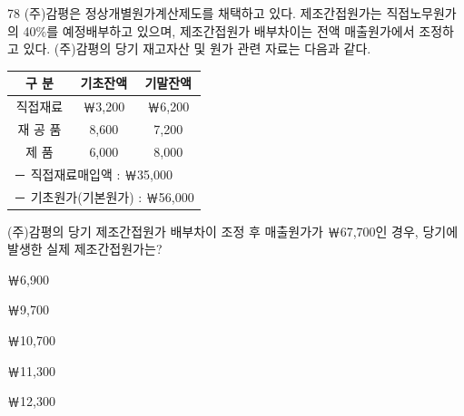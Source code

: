 \begin{question}{78}
(주)감평은 정상개별원가계산제도를 채택하고 있다. 제조간접원가는 직접노무원가의 40\%를 예정배부하고 있으며, 제조간접원가 배부차이는 전액 매출원가에서 조정하고 있다. (주)감평의 당기 재고자산 및 원가 관련 자료는 다음과 같다.
\par{\small\centering\begin{tabular}{|c|c|c|}\hline
구 분 & 기초잔액 & 기말잔액 \\ \hline
직접재료 & ￦3,200 & ￦6,200 \\ \hline
재 공 품 & 8,600 & 7,200 \\ \hline
제 \quad 품 & 6,000 & 8,000 \\ \hline
\multicolumn{3}{|l|}{ － 직접재료매입액 : ￦35,000} \\ \hline
\multicolumn{3}{|l|}{ － 기초원가(기본원가) : ￦56,000} \\ \hline
\end{tabular}\par}
(주)감평의 당기 제조간접원가 배부차이 조정 후 매출원가가 ￦67,700인 경우, 당기에 발생한 실제 제조간접원가는?
\begin{choices}
  \item ￦6,900
  \item ￦9,700
  \item ￦10,700
  \item ￦11,300
  \item ￦12,300
\end{choices}
\end{question}
